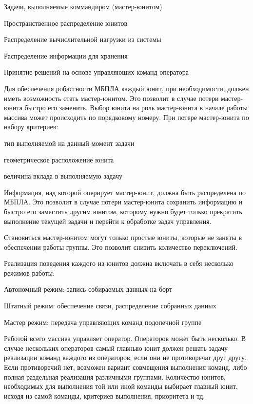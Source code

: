 Задачи, выполняемые коммандиром (мастер-юнитом).

\begin{mintemize}
\item Пространственное распределение юнитов
\item Распределение вычислительной нагрузки из системы
\item Распределение информации для хранения
\item Принятие решений на основе управляющих команд оператора
\end{mintemize}

Для обеспечения робастности МБПЛА каждый юнит, при необходимости, должен
иметь возможность стать мастер-юнитом. Это позволит в случае потери
мастер-юнита быстро его заменить. Выбор юнита на роль мастер-юнита в начале
работы массива может происходить по порядковому номеру. При потере
мастер-юнита по набору критериев:

\begin{mintemize}
\item тип выполняемой на данный момент задачи
\item геометрическое расположение юнита
\item величина вклада в выполняемую задачу
\end{mintemize}

Информация, над которой оперирует мастер-юнит, должна быть распределена по
МБПЛА. Это позволит в случае потери мастер-юнита сохранить информацию
и быстро его заместить другим юнитом, которому нужно будет только
прекратить выполнение текущей задачи и перейти к обработке задач управления.

Становиться мастер-юнитом могут только простые юниты, которые не заняты в
обеспечении работы группы. Это позволит снизить количество переключений.

Реализация поведения каждого из юнитов должна включать в себя
несколько режимов работы:

\begin{mintemize}
\item Автономный режим: запись собираемых данных на борт
\item Штатный режим: обеспечение связи, распределение собранных данных
\item Мастер режим: передача управляющих команд подопечной группе
\end{mintemize}

Работой всего массива управляет оператор. Операторов может быть несколько.
В случае нескольких операторов самый главныю юнит должен решать задачу
реализации команд каждого из операторов, если они не противоречат друг другу.
Если противоречий нет, возможен вариант совмещения выполнения команд, либо
полная раздельная реализация различными группами. Количество юнитов, необходимых
для выполнения той или иной команды выбирает главный юнит, исходя из самой 
команды, критериев выполнения, приоритета и тд.
